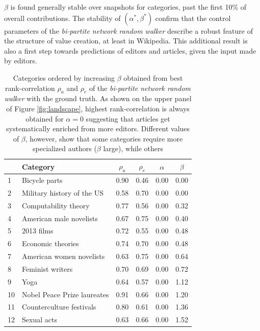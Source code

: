 $\beta$ is found generally stable over snapshots for categories, past the first 10\% of overall contributions. The stability of $(\alpha^*,\beta^*)$ confirm that the control parameters of the {\it bi-partite network random walker} describe a robust feature of the structure of value creation, at least in Wikipedia. This additional result is also a first step towards predictions of editors and articles, given the input made by editors.


\begin{table}
\begin{tabular}{|llcccc|}
\hline
         &                     Category & $\rho_a$ & $\rho_e$ & $\alpha$ & $\beta$ \\
\hline
 1&                        Bicycle parts  &     0.90 &     0.46 &     0.00 &    0.00 \\
 2&Military history of the US  &     0.58 &     0.70 &     0.00 &    0.00 \\
  3&                Computability theory &     0.77 &     0.56 &     0.00 &    0.32 \\
   4&            American male novelists &     0.67 &     0.75 &     0.00 &    0.40 \\
    5&                        2013 films  &     0.72 &     0.55 &     0.00 &    0.48 \\
     6&                Economic theories  &     0.74 &     0.70 &     0.00 &    0.48 \\
     7&         American women novelists  &     0.63 &     0.75 &     0.00 &    0.64 \\
     8&                 Feminist writers  &     0.70 &     0.69 &     0.00 &    0.72 \\
     9&                             Yoga  &     0.64 &     0.57 &     0.00 &    1.12 \\
     10&      Nobel Peace Prize laureates  &     0.91 &     0.66 &     0.00 &    1.20 \\
      11&        Counterculture festivals  &     0.80 &     0.61 &     0.00 &    1.36 \\
        12&                   Sexual acts  &     0.63 &     0.66 &     0.00 &    1.52 \\
\hline
\end{tabular}
\caption{Categories ordered by increasing $\beta$ obtained from best rank-correlation $\rho_a$ and  $\rho_e$
 of the {\it bi-partite network random walker} with the ground truth. As shown on the upper panel of Figure \ref{fig:landscape}, highest rank-correlation is always obtained for $\alpha = 0$ suggesting that articles get systematically enriched from more editors. Different values of $\beta$, however, show that some categories require more specialized authors ($\beta$ large), while others}
\label{tab:maxbeta}
\end{table}


